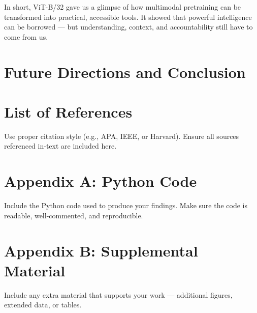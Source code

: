 \documentclass[12pt]{article}
\begin{document}
In short, ViT-B/32 gave us a glimpse of how multimodal pretraining can be transformed into practical, accessible tools. It showed that powerful intelligence can be borrowed — but understanding, context, and accountability still have to come from us.

\section{Future Directions and Conclusion}


\newpage
\section*{List of References}
Use proper citation style (e.g., APA, IEEE, or Harvard).  
Ensure all sources referenced in-text are included here.

\appendix

\section{Appendix A: Python Code}
Include the Python code used to produce your findings.  
Make sure the code is readable, well-commented, and reproducible.

\section{Appendix B: Supplemental Material}
Include any extra material that supports your work — additional figures, extended data, or tables.
\end{document}
